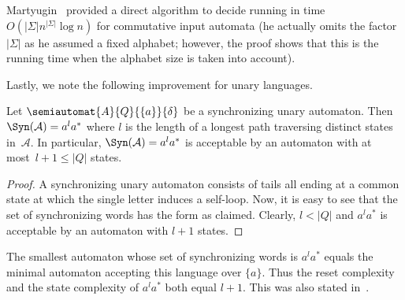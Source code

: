 Martyugin~\cite[Prop.~5.2]{Mar2009b} provided a direct algorithm to decide \DFASWS  
running in time $O(|\Sigma|n^{|\Sigma|}\log n)$ for commutative input automata 
(he actually omits the factor~$|\Sigma|$ as he assumed a fixed alphabet; 
however, the proof shows that this is the running time 
when the alphabet size is taken into account).

Lastly, we note the following improvement for unary languages.

\begin{proposition} \label{syncmax:prop:unary-sync-words}
	Let $\semiautomat{A}{Q}{\{a\}}{\delta}$
	be a synchronizing unary automaton.
	Then $\Syn(\mathcal A) = a^{l} a^*$
	where $l$ is the length of a longest path traversing distinct states in~$\mathcal A$.
	In particular, $\Syn(\mathcal A) = a^{l} a^*$
	is acceptable by an automaton with at most~$l + 1\le |Q|$ states.
\end{proposition}
\begin{proof}
	A synchronizing unary automaton consists of tails all ending at a common state
	at which the single letter induces a self-loop.
	Now, it is easy to see that the set of synchronizing words
	has the form as claimed. Clearly, $l < |Q|$
	and $a^{l} a^*$ is acceptable by an automaton with $l + 1$ states.
\end{proof}

The smallest automaton whose set of synchronizing words is $a^la^*$
equals the minimal automaton accepting this language over $\{a\}$.
Thus the reset complexity and the state complexity of $a^la^*$ both equal $l+1$.
This was also stated in~\cite[Prop.~1]{DBLP:journals/corr/Maslennikova14}.